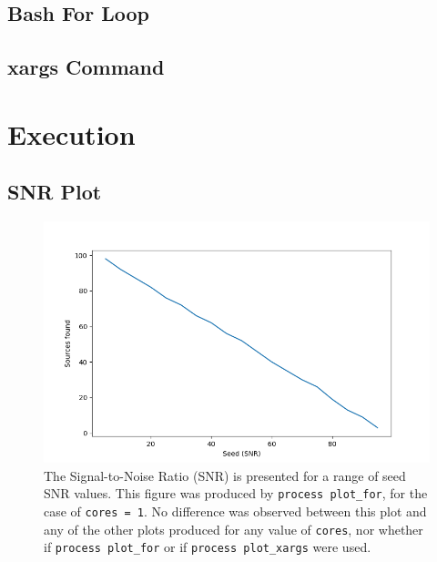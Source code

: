 \documentclass{article}
\begin{document}
\subsection{Bash For Loop}
\label{sec:bash-for-loop}



\subsection{xargs Command}
\label{sec:xargs-command}



\section{Execution}
\label{sec:execution}

\subsection{SNR Plot}
\label{sec:snr-plot}

\begin{figure}[h]
  \centering
  \includegraphics[scale = 0.75]{../nextflow/output/plot_for_1.png}
  \caption[SNR Plot]{
    The Signal-to-Noise Ratio (SNR) is presented for a range of seed SNR values.
    This figure was produced by
    \lstinline[morekeywords={process}]{process plot_for}, for the case of
    \lstinline{cores = 1}.
    No difference was observed between this plot and any of the other plots
    produced for any value of \lstinline{cores}, nor whether if
    \lstinline[morekeywords={process}]{process plot_for} or if
    \lstinline[morekeywords={process}]{process plot_xargs} were used.
  }
  \label{fig:snr-plot}
\end{figure}
\end{document}
